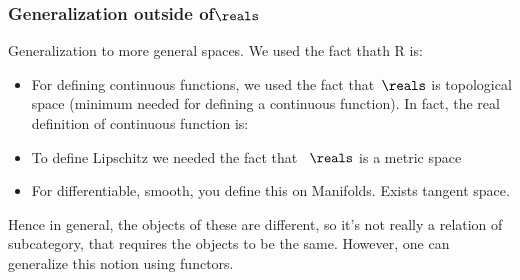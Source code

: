 \subsubsection{Generalization outside of$\reals$}
Generalization to more general spaces.
We used the fact thath R is:
\begin{itemize}
    \item For defining continuous functions, we used the fact that~$\reals$ is topological space (minimum needed for defining a continuous function).
    In fact, the real definition of continuous function is:


    \item To define Lipschitz we needed the fact that~ $\reals$ is a metric space
    \item For differentiable, smooth, you define this on Manifolds. Exists tangent space.
\end{itemize}

Hence in general, the objects of these are different, so it's not really a relation of subcategory, that requires
the objects to be the same. However, one can generalize this notion using functors.

